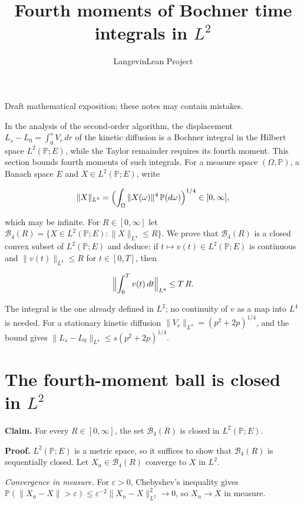 \documentclass[11pt,a4paper]{article}
\title{\texorpdfstring{Fourth moments of Bochner time integrals in \(L^2\)}{Fourth moments of Bochner time integrals in L²}}
\author{LangevinLean Project}
\date{}
\begin{document}
\maketitle
Draft mathematical exposition; these notes may contain mistakes.


In the analysis of the second-order algorithm, the displacement \(L_s-L_0=\int_0^sV_r\,dr\) of the kinetic diffusion is a Bochner integral in the Hilbert space \(L^2(\mathbb P;E)\), while the Taylor remainder requires its fourth moment. This section bounds fourth moments of such integrals. For a measure space \((\Omega,\mathbb P)\), a Banach space \(E\) and \(X\in L^2(\mathbb P;E)\), write


\[\|X\|_{L^4}=\Bigl(\int_\Omega\|X(\omega)\|^4\,\mathbb P(d\omega)\Bigr)^{1/4}\in[0,\infty],\]


which may be infinite. For \(R\in[0,\infty]\) let \(\mathcal B_4(R)=\{X\in L^2(\mathbb P;E):\|X\|_{L^4}\le R\}\). We prove that \(\mathcal B_4(R)\) is a closed convex subset of \(L^2(\mathbb P;E)\) and deduce: if \(t\mapsto v(t)\in L^2(\mathbb P;E)\) is continuous and \(\|v(t)\|_{L^4}\le R\) for \(t\in[0,T]\), then


\[\Bigl\|\int_0^Tv(t)\,dt\Bigr\|_{L^4}\le T\,R.\]


The integral is the one already defined in \(L^2\); no continuity of \(v\) as a map into \(L^4\) is needed. For a stationary kinetic diffusion \(\|V_r\|_{L^4}=(p^2+2p)^{1/4}\), and the bound gives \(\|L_s-L_0\|_{L^4}\le s(p^2+2p)^{1/4}\).


\section{\texorpdfstring{The fourth-moment ball is closed in \(L^2\)}{The fourth-moment ball is closed in L²}}


\textbf{Claim.} For every \(R\in[0,\infty]\), the set \(\mathcal B_4(R)\) is closed in \(L^2(\mathbb P;E)\).




\textbf{Proof.} \(L^2(\mathbb P;E)\) is a metric space, so it suffices to show that \(\mathcal B_4(R)\) is sequentially closed. Let \(X_n\in\mathcal B_4(R)\) converge to \(X\) in \(L^2\).




\emph{Convergence in measure.} For \(\varepsilon>0\), Chebyshev's inequality gives \(\mathbb P(\|X_n-X\|>\varepsilon)\le\varepsilon^{-2}\|X_n-X\|_{L^2}^2\to0\), so \(X_n\to X\) in measure.
\end{document}
